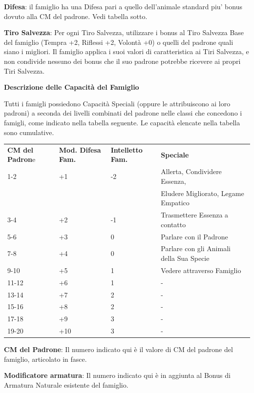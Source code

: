 \documentclass[a4paper,11pt,twoside,openany]{book}
\begin{document}
\textbf{Difesa}: il famiglio ha una Difesa pari a quello dell'animale standard piu' bonus dovuto alla CM del padrone. Vedi tabella sotto.

\textbf{Tiro Salvezza}: Per ogni Tiro Salvezza, utilizzare i bonus al Tiro Salvezza Base del famiglio (Tempra +2, Riflessi +2, Volontà +0) o quelli del padrone quali siano i migliori. Il famiglio applica i suoi valori di caratteristica ai Tiri Salvezza, e non condivide nessuno dei bonus che il suo padrone potrebbe ricevere ai propri Tiri Salvezza.

\bigskip

\textbf{Descrizione delle Capacità del Famiglio}

Tutti i famigli possiedono Capacità Speciali (oppure le attribuiscono ai loro padroni) a seconda dei livelli combinati del padrone nelle classi che concedono i famigli, come indicato nella tabella seguente. Le capacità elencate nella tabella sono cumulative.

\bigskip

\begin{tabularx}{0.95\textwidth}{lllX}
	\toprule
	\textbf{CM del Padron}e & \textbf{Mod. Difesa Fam.} & \textbf{Intelletto Fam.} & \textbf{Speciale}\\
	1-2      & +1       & -2    & Allerta, Condividere Essenza, \\
	         &  		&  		& Eludere Migliorato, Legame Empatico\\
	3-4      & +2       & -1    & Trasmettere Essenza a contatto\\
	5-6      & +3       & 0     & Parlare con il Padrone\\
	7-8      & +4       & 0     & Parlare con gli Animali della Sua Specie\\
	9-10     & +5       & 1     & Vedere attraverso Famiglio\\
	11-12    & +6       & 1     & -\\
	13-14    & +7       & 2     & -\\
	15-16    & +8       & 2     & -\\
	17-18    & +9       & 3     & -\\
	19-20    & +10      & 3     & -\\
\end{tabularx}

\bigskip

\textbf{CM del Padrone}: Il numero indicato qui è il valore di CM del padrone del famiglio, articolato in fasce.

\textbf{Modificatore armatura}: Il numero indicato qui è in aggiunta al Bonus di Armatura Naturale esistente del famiglio.
\end{document}
